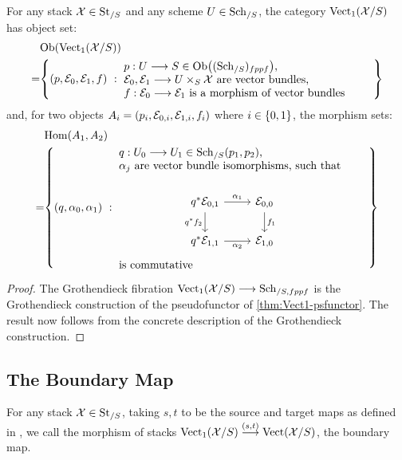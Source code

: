 \documentclass[11pt]{amsart}
\begin{document}
\begin{thm}
For any stack $\mathcal{X} \in \mathrm{St}_{/S}$ and any scheme $U \in \mathrm{Sch}_{/S}$,
the category $\mathrm{Vect}_1(\mathcal{X}/S)$ has object set:
\begin{align*}
 & \Ob{\Vect_1(\mcX/S)} \\
=& \set[{
  (p, \mc{E}_0, \mc{E}_1, f)
}]{
  \parbox{0.65\textwidth}{
    $p : U \to S \in \Ob{(\Sch_{/S})_{fppf}}$, \\
    $\mc{E}_0, \mc{E}_1 \to U \times_S \mcX$ are vector bundles, \\
    $f : \mc{E}_0 \to \mc{E}_1$ is a morphism of vector bundles
  }
}
\end{align*}
and, for two objects $A_i = (p_i, \mathcal{E}_{0, i}, \mathcal{E}_{1, i}, f_i)$ where
$i \in \set{0, 1}$, the morphism sets:
\begin{align*}
 & \Hom(A_1, A_2) \\
=& \set[{(q, \alpha_0, \alpha_1)}]{
  \parbox{0.65\textwidth}{
    $q : U_0 \to U_1 \in \Sch_{/S}(p_1, p_2)$, \\
    $\alpha_j$ are vector bundle isomorphisms, such that\\
    \begin{center}
    \begin{tikzcd}[ampersand replacement=\&]
      q^*\mc{E}_{0, 1} \ar[r, "\alpha_1" above] \ar[d, "q^*f_2" left] \&
      \mc{E}_{0, 0} \ar[d, "f_1"] \\
      q^*\mc{E}_{1, 1} \ar[r, "\alpha_2" below] \&
      \mc{E}_{1, 0} \&
    \end{tikzcd}
    \end{center}
    is commutative
  }
}
\end{align*}
\end{thm}
\begin{proof}
The Grothendieck fibration $\Vect_1(\mcX/S) \to \Sch_{/S, fppf}$ is the
Grothendieck construction of the pseudofunctor of \cref{thm:Vect1-psfunctor}.
The result now follows from the concrete description of the Grothendieck
construction.
\end{proof}

\subsection{The Boundary Map}

\begin{defn}
For any stack $\mathcal{X} \in \mathrm{St}_{/S}$, taking $s, t$ to be the source and target
maps as defined in \cite[\S 3]{ModQuivBun}, we call the morphism of stacks
$\Vect_1(\mcX/S) \to[{(s, t)}] \Vect(\mcX/S)$, the boundary map.
\end{defn}
\end{document}
